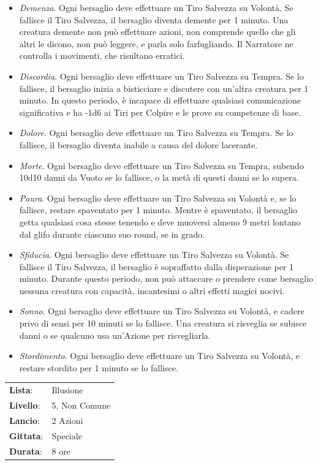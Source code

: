 \begin{multicols}{2}
\begin{itemize}[leftmargin=*] \setlength{\itemsep}{0pt}
	\item \emph{Demenza}. Ogni bersaglio deve effettuare un Tiro Salvezza su Volontà. Se fallisce il Tiro Salvezza, il bersaglio diventa demente per 1 minuto. Una creatura demente non può effettuare azioni, non comprende quello che gli altri le dicono, non può leggere, e parla solo farfugliando. Il Narratore ne controlla i movimenti, che risultano erratici.
	\item \emph{Discordia}. Ogni bersaglio deve effettuare un Tiro Salvezza su Tempra. Se lo fallisce, il bersaglio inizia a bisticciare e discutere con un'altra creatura per 1 minuto. In questo periodo, è incapace di effettuare qualsiasi comunicazione significativa e ha -1d6 ai Tiri per Colpire e le prove su competenze di base.
	\item \emph{Dolore}. Ogni bersaglio deve effettuare un Tiro Salvezza su Tempra. Se lo fallisce, il bersaglio diventa inabile a causa del dolore lacerante.
	\item \emph{Morte}. Ogni bersaglio deve effettuare un Tiro Salvezza su Tempra, subendo 10d10 danni da Vuoto se lo fallisce, o la metà di questi danni se lo supera.
	\item \emph{Paura}. Ogni bersaglio deve effettuare un Tiro Salvezza su Volontà e, se lo fallisce, restare spaventato per 1 minuto. Mentre è spaventato, il bersaglio getta qualsiasi cosa stesse tenendo e deve muoversi almeno 9 metri lontano dal glifo durante ciascuno suo round, se in grado.
	\item \emph{Sfiducia}. Ogni bersaglio deve effettuare un Tiro Salvezza su Volontà. Se fallisce il Tiro Salvezza, il bersaglio è sopraffatto dalla disperazione per 1 minuto. Durante questo periodo, non può attaccare o prendere come bersaglio nessuna creatura con capacità, incantesimi o altri effetti magici nocivi.
	\item \emph{Sonno}. Ogni bersaglio deve effettuare un Tiro Salvezza su Volontà, e cadere privo di sensi per 10 minuti se lo fallisce. Una creatura si risveglia se subisce danni o se qualcuno usa un'Azione per risvegliarla.
	\item \emph{Stordimento}. Ogni bersaglio deve effettuare un Tiro Salvezza su Volontà, e restare stordito per 1 minuto se lo fallisce.
\end{itemize}

\noindent\begin{tabularx}{\linewidth}{p{1.3cm}X}
	\rowcolor{gray!20}\textbf{Lista}: & Illusione \\
	\textbf{Livello}: & 5, Non Comune \\
	\rowcolor{gray!20}\textbf{Lancio}: & 2 Azioni \\
	\textbf{Gittata}: & Speciale \\
	\rowcolor{gray!20}\textbf{Durata}: & 8 ore \\
\end{tabularx}\smallskip


\end{multicols}
